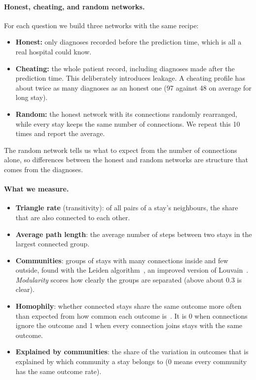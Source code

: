 \documentclass[11pt]{article}
\begin{document}
\paragraph{Honest, cheating, and random networks.} For each question we build three networks with the same recipe:
\begin{itemize}
  \item \textbf{Honest:} only diagnoses recorded before the prediction time, which is all a real hospital could know.
  \item \textbf{Cheating:} the whole patient record, including diagnoses made after the prediction time. This deliberately introduces leakage. A cheating profile has about twice as many diagnoses as an honest one (97 against 48 on average for long stay).
  \item \textbf{Random:} the honest network with its connections randomly rearranged, while every stay keeps the same number of connections. We repeat this 10 times and report the average.
\end{itemize}
The random network tells us what to expect from the number of connections alone, so differences between the honest and random networks are structure that comes from the diagnoses.

\paragraph{What we measure.}
\begin{itemize}
  \item \textbf{Triangle rate} (transitivity): of all pairs of a stay's neighbours, the share that are also connected to each other.
  \item \textbf{Average path length}: the average number of steps between two stays in the largest connected group.
  \item \textbf{Communities}: groups of stays with many connections inside and few outside, found with the Leiden algorithm~\cite{traag2019louvain}, an improved version of Louvain~\cite{blondel2008fast}. \emph{Modularity} scores how clearly the groups are separated (above about 0.3 is clear).
  \item \textbf{Homophily}: whether connected stays share the same outcome more often than expected from how common each outcome is~\cite{lim2021large}. It is 0 when connections ignore the outcome and 1 when every connection joins stays with the same outcome.
  \item \textbf{Explained by communities}: the share of the variation in outcomes that is explained by which community a stay belongs to (0 means every community has the same outcome rate).
\end{itemize}
\end{document}
